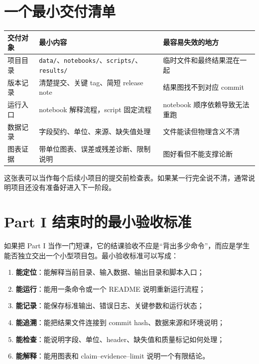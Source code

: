 \section*{一个最小交付清单}

\begin{center}
\begin{tabular}{p{} p{} p{}}
\toprule
交付对象 & 最小内容 & 最容易失效的地方 \\
\midrule
项目目录 & \texttt{data/}、\texttt{notebooks/}、\texttt{scripts/}、\texttt{results/} & 临时文件和最终结果混在一起 \\
版本记录 & 清楚提交、关键 tag、简短 release note & 结果图找不到对应 commit \\
运行入口 & notebook 解释流程，script 固定流程 & notebook 顺序依赖导致无法重跑 \\
数据记录 & 字段契约、单位、来源、缺失值处理 & 文件能读但物理含义不清 \\
图表证据 & 带单位图表、误差或残差诊断、限制说明 & 图好看但不能支撑论断 \\
\bottomrule
\end{tabular}
\end{center}

这张表可以当作每个后续小项目的提交前检查表。如果某一行完全说不清，通常说明项目还没有准备好进入下一阶段。

\section*{Part I 结束时的最小验收标准}

如果把 Part I 当作一门短课，它的结课验收不应是“背出多少命令”，而应是学生能否独立交出一个小型项目包。最小验收标准可以写成：

\begin{enumerate}
    \item \textbf{能定位}：能解释当前目录、输入数据、输出目录和脚本入口；
    \item \textbf{能运行}：能用一条命令或一个 README 说明重新运行流程；
    \item \textbf{能记录}：能保存标准输出、错误日志、关键参数和运行状态；
    \item \textbf{能追溯}：能把结果文件连接到 commit hash、数据来源和环境说明；
    \item \textbf{能检查}：能说明字段、单位、header、缺失值和质量标记如何处理；
    \item \textbf{能解释}：能用图表和 claim--evidence--limit 说明一个有限结论。
\end{enumerate}

